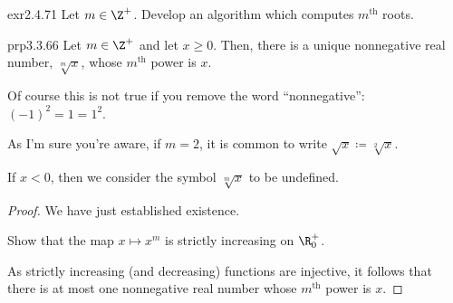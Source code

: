\begin{exr}{}{exr2.4.71}
Let $m\in \Z ^+$.  Develop an algorithm which computes $m^{\text{th}}$ roots.
\end{exr}
\begin{prp}{}{prp3.3.66}
Let $m\in \Z ^+$ and let $x\geq 0$.  Then, there is a unique nonnegative real number, $\sqrt[m]{x}$, whose $m^{\text{th}}$ power is $x$.
\begin{rmk}
Of course this is not true if you remove the word ``nonnegative'':  $(-1)^2=1=1^2$.
\end{rmk}
\begin{rmk}
As I'm sure you're aware, if $m=2$, it is common to write $\sqrt{x}\coloneqq \sqrt[2]{x}$.
\end{rmk}
\begin{rmk}
If $x<0$, then we consider the symbol $\sqrt[m]{x}$ to be undefined.
\end{rmk}
\begin{proof}
We have just established existence.
\begin{exr}[breakable=false]{}{}
Show that the map $x\mapsto x^m$ is strictly increasing on $\R _0^+$.
\end{exr}
As strictly increasing (and decreasing) functions are injective, it follows that there is at most one nonnegative real number whose $m^{\text{th}}$ power is $x$.
\end{proof}
\end{prp}

